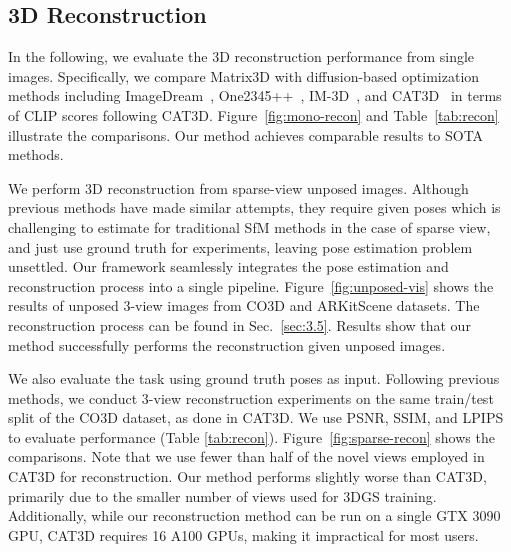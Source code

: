 \subsection{3D Reconstruction}
In the following, we evaluate the 3D reconstruction performance from single images. Specifically, we compare Matrix3D with diffusion-based optimization methods including ImageDream~\cite{wang2023imagedream}, One2345++~\cite{liu2024one2345}, IM-3D~\cite{melas20243d}, and CAT3D~\cite{gao2024cat3d} in terms of CLIP scores following CAT3D. Figure~\ref{fig:mono-recon} and Table~\ref{tab:recon} illustrate the comparisons. Our method achieves comparable results to SOTA methods.


We perform 3D reconstruction from sparse-view unposed images. 
Although previous methods have made similar attempts, they require given poses which is challenging to estimate for traditional SfM methods in the case of sparse view, and just use ground truth for experiments, leaving pose estimation problem unsettled. 
Our framework seamlessly integrates the pose estimation and reconstruction process into a single pipeline. Figure~\ref{fig:unposed-vis} shows the results of unposed 3-view images from CO3D and ARKitScene datasets. The reconstruction process can be found in Sec.~\ref{sec:3.5}. Results show that our method successfully performs the reconstruction given unposed images.



We also evaluate the task using ground truth poses as input. Following previous methods, we conduct 3-view reconstruction experiments on the same train/test split of the CO3D dataset, as done in CAT3D\cite{gao2024cat3d}. We use PSNR, SSIM, and LPIPS to evaluate performance (Table \ref{tab:recon}). Figure~\ref{fig:sparse-recon} shows the comparisons. Note that we use fewer than half of the novel views employed in CAT3D for reconstruction. Our method performs slightly worse than CAT3D, primarily due to the smaller number of views used for 3DGS training. Additionally, while our reconstruction method can be run on a single GTX 3090 GPU, CAT3D requires 16 A100 GPUs, making it impractical for most users.





